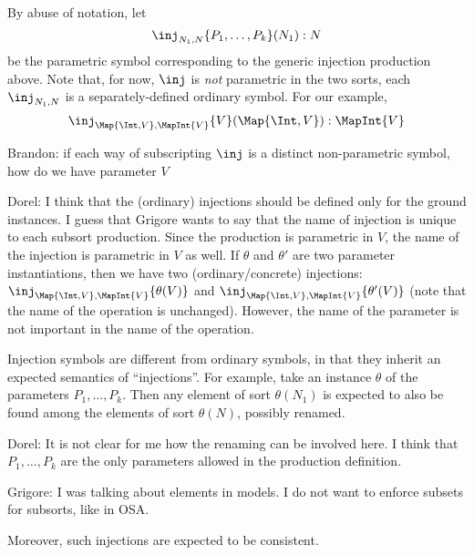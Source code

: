 \documentclass{article}
\newcommand\comment[2]{\par\noindent\color{red}#1: #2\color{black}\par\noindent}
\newcommand\dl{\comment{Dorel}}
\newcommand\gr{\comment{Grigore}}
\theoremstyle{definition}
\theoremstyle{definition}
\theoremstyle{definition}
\theoremstyle{definition}
\theoremstyle{definition}
\theoremstyle{theorem}
\theoremstyle{theorem}
\theoremstyle{theorem}
\theoremstyle{theorem}
\theoremstyle{theorem}
\begin{document}
By abuse of notation, let
\[\inj_{N_1,N}\{P_1,\ldots,P_k\}(N_1):N\]
be the parametric symbol corresponding to the generic injection
production above.
Note that, for now, \(\inj\) is \emph{not} parametric in the two sorts,
each \(\inj_{N_1,N}\) is a separately-defined ordinary symbol.
For our example,
\[\inj_{\Map{\Int,V},\MapInt{V}}\{V\}(\Map{\Int,V}): \MapInt{V}\]
\comment{Brandon}{if each way of subscripting \(\inj\) is a distinct non-parametric
symbol, how do we have parameter \(V\) }
\dl{I think that the (ordinary) injections should be defined only for the ground instances. I guess that Grigore wants to say that the name of injection is unique to each subsort production. Since the production is parametric in $V$, the name of the injection is parametric in $V$ as well. 
If $\theta$ and $\theta'$ are two parameter instantiations, then we have two (ordinary/concrete) injections: $\inj_{\Map{\Int,V},\MapInt{V}}\{\theta(V)\}$ and $\inj_{\Map{\Int,V},\MapInt{V}}\{\theta'(V)\}$ (note that the name of the operation is unchanged).
However, the name of the parameter is not important in the name of the operation.
}

Injection symbols are different from ordinary symbols, in that they
inherit an expected semantics of ``injections''.
For example, take an instance \(\theta\) of the parameters
\(P_1,\ldots,P_k\).
Then any element of sort \(\theta(N_1)\) is expected to also be found
among the elements of sort \(\theta(N)\), possibly renamed.
\dl{It is not clear for me how the renaming can be involved here. I think that \(P_1,\ldots,P_k\) are the only parameters allowed in the production definition.}
\gr{I was talking about elements in models.  I do not want to enforce subsets for subsorts, like in OSA.}
Moreover, such injections are expected to be consistent.
\end{document}
